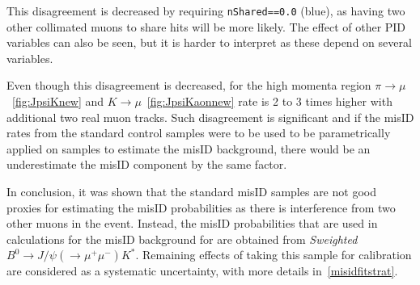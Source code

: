 
This disagreement is decreased by requiring \texttt{nShared==0.0} (blue), as having two other collimated muons to share hits will be more likely. The effect of other \gls{PID} variables can also be seen, but it is harder to interpret as these depend on several variables.

Even though this disagreement is decreased, for the high momenta region $\pi \rightarrow \mu$ ~\autoref{fig:JpsiKnew} and $K \rightarrow \mu$~\autoref{fig:JpsiKaonnew} rate is 2 to 3 times higher with additional two real muon tracks. Such disagreement is significant and if the misID rates from the standard control samples were to be used to be parametrically applied on samples to estimate the misID background, there would be an underestimate the misID component by the same factor.

In conclusion, it was shown that the standard misID samples are not good proxies for estimating the misID probabilities as there is interference from two other muons in the event. Instead, the misID probabilities that are used in calculations for the misID background for \Bmumumu are obtained from \textit{Sweighted} $B^{0} \rightarrow J/\psi(\rightarrow \mu^{+} \mu^{-}) K^{*}$. Remaining effects of taking this sample for calibration are considered as a systematic uncertainty, with more details in~\autoref{misidfitstrat}.



